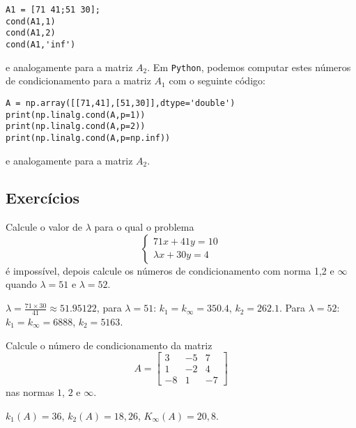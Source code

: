 \begin{sol}
\begin{verbatim}
A1 = [71 41;51 30];
cond(A1,1)
cond(A1,2)
cond(A1,'inf')
\end{verbatim}
e analogamente para a matriz $A_2$.
\fi
\ifispython
Em \verb+Python+, podemos computar estes números de condicionamento para a matriz $A_1$ com o seguinte código:
\begin{verbatim}
A = np.array([[71,41],[51,30]],dtype='double')
print(np.linalg.cond(A,p=1))
print(np.linalg.cond(A,p=2))
print(np.linalg.cond(A,p=np.inf))
\end{verbatim}
e analogamente para a matriz $A_2$.
\fi
\end{sol}

\subsection*{Exercícios}

\begin{exer} Calcule o valor de $\lambda$ para o qual o problema
\begin{equation}\left\{ \begin{array}{l}71x+41y=10\\
\lambda x+30y=4
\end{array}
\right.\end{equation}
é impossível, depois calcule os números de condicionamento com norma 1,2 e $\infty$ quando $\lambda=51$ e $\lambda=52$.
\end{exer}
\begin{resp}

$\lambda=\frac{71\times 30}{41}\approx  51.95122$, para $\lambda=51$: $k_1=k_\infty=350.4$, $k_2=262.1$. Para $\lambda=52$: $k_1=k_\infty= 6888$, $k_2=5163$.

\end{resp}

\begin{exer}
  Calcule o número de condicionamento da matriz
\begin{equation}A=\left[
\begin{array}{ccc}
3 & -5 & 7\\
1 & -2 & 4\\
-8 & 1 & -7
\end{array}
\right]\end{equation}
nas normas $1$, $2$ e $\infty$.
\end{exer}
\begin{resp}

  $k_1(A)=36$, $k_2(A)=18,26$, $K_\infty(A)=20,8$.

\end{resp}


